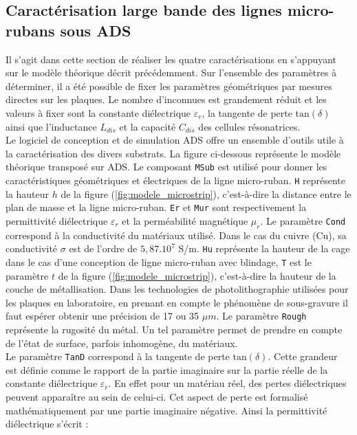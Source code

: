 \documentclass[french]{article}
\begin{document}
\subsection{Caractérisation large bande des lignes micro-rubans sous ADS}

Il s'agit dans cette section de réaliser les quatre caractérisations en s'appuyant sur le modèle théorique décrit précédemment. Sur l'ensemble des paramètres à déterminer, il a été possible de fixer les paramètres géométriques par mesures directes sur les plaques. Le nombre d'inconnues est grandement réduit et les valeurs à fixer sont la constante diélectrique $\varepsilon_r$, la tangente de perte $\mbox{tan}(\delta)$ ainsi que l'inductance $L_{dis}$ et la capacité $C_{dis}$ des cellules résonatrices.\\
Le logiciel de conception et de simulation ADS offre un ensemble d'outils utile à la caractérisation des divers substrats. La figure ci-dessous représente le modèle théorique transposé sur ADS. Le composant \texttt{MSub} est utilisé pour donner les caractéristiques géométriques et électriques de la ligne micro-ruban. \texttt{H} représente la hauteur $h$ de la figure (\ref{fig:modele_microstrip}), c'est-à-dire la distance entre le plan de masse et la ligne micro-ruban. \texttt{Er} et \texttt{Mur} sont respectivement la permittivité diélectrique $\varepsilon_r$ et la perméabilité magnétique $\mu_r$. Le paramètre \texttt{Cond} correspond à la conductivité du matériaux utilisé. Dans le cas du cuivre (Cu), sa conductivité $\sigma$ est de l'ordre de $5,87.10^{7}$ S/m. \texttt{Hu} représente la hauteur de la cage dans le cas d'une conception de ligne micro-ruban avec blindage, \texttt{T} est le paramètre $t$ de la figure (\ref{fig:modele_microstrip}), c'est-à-dire la hauteur de la couche de métallisation. Dans les technologies de photolithographie utilisées pour les plaques en laboratoire, en prenant en compte le phénomène de sous-gravure il faut espérer obtenir une précision de 17 ou 35 $\mu m$. Le paramètre \texttt{Rough} représente la rugosité du métal. Un tel paramètre permet de prendre en compte de l'état de surface, parfois inhomogène, du matériaux.\\
Le paramètre \texttt{TanD} correspond à la tangente de perte $\mbox{tan}(\delta)$. Cette grandeur est définie comme le rapport de la partie imaginaire sur la partie réelle de la constante diélectrique $\varepsilon_r$. En effet pour un matériau réel, des pertes diélectriques peuvent apparaître au sein de celui-ci. Cet aspect de perte est formalisé mathématiquement par une partie imaginaire négative. Ainsi la permittivité diélectrique s'écrit :
\end{document}

